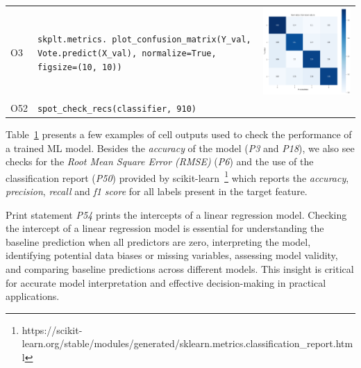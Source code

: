\begin{table}
\begin{tabular}{@{}m{} m{} m{}@{}}
    O3&
    \lstinline[]$skplt.metrics. plot_confusion_matrix(Y_val, Vote.predict(X_val), normalize=True, figsize=(10, 10))$&
    \includegraphics[width=\linewidth]{model-perf-confusion-matrix.png}\\

    O52&
    \lstinline[]$spot_check_recs(classifier, 910)$&
    \\
    \bottomrule
  \end{tabular}
  \label{tab:model-perf}
\end{table}

Table~\ref{tab:model-perf} presents a few examples of cell outputs used to check the performance of a trained ML model. Besides the \emph{accuracy} of the model (\emph{P3} and \emph{P18}), we also see checks for the \emph{Root Mean Square Error (RMSE)} (\emph{P6}) and the use of the classification report (\emph{P50}) provided by scikit-learn~\footnote{https://scikit-learn.org/stable/modules/generated/sklearn.metrics.classification\_report.html} which reports the \emph{accuracy}, \emph{precision}, \emph{recall} and \emph{f1 score} for all labels present in the target feature.

Print statement \emph{P54} prints the intercepts of a linear regression model. Checking the intercept of a linear regression model is essential for understanding the baseline prediction when all predictors are zero, interpreting the model, identifying potential data biases or missing variables, assessing model validity, and comparing baseline predictions across different models. This insight is critical for accurate model interpretation and effective decision-making in practical applications.

